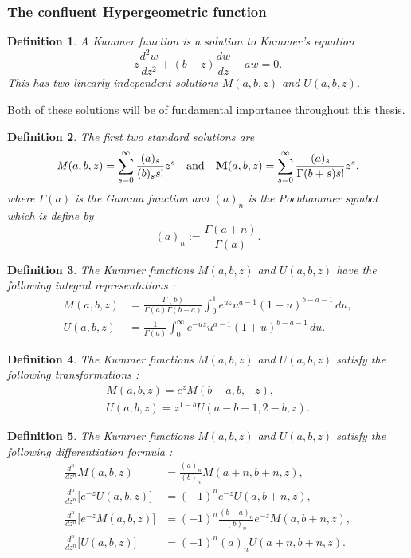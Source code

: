 \documentclass[12pt]{article}
\def\e{e^{-z}}
\newtheorem{mydef1}{Definition}[section]
\numberwithin{figure}{section}
\numberwithin{equation}{section}
\numberwithin{table}{section}
\begin{document}
\subsubsection{The confluent Hypergeometric function}
\begin{mydef1}
A Kummer function is a solution to Kummer's equation \cite[\S13.2(i)]{DLMF}
$$z\frac{d^2w}{dz^2}+(b-z)\frac{dw}{dz}-aw=0.$$
This has two linearly independent solutions $M(a,b,z)$ and $U(a,b,z)$.
\end{mydef1}
Both of these solutions will be of fundamental importance throughout this
thesis.
\begin{mydef1}
The first two standard solutions are \cite[\S13.2(i)]{DLMF}
\begin{equation}
{\it{M}}(a,b,z)=\sum^\infty_{s=0}\frac{(a)_s}{(b)_ss!}z^s\quad {\rm{and}}\quad{\bf{M}}
(a,b,z)=\sum^\infty_{s=0}\frac{(a)_s}{\Gamma(b+s)s!}z^s.\label{sum}
\end{equation}
where $\Gamma(a)$ is the Gamma function and $(a)_n$ is the Pochhammer symbol which is define by
$$(a)_n:=\frac{\Gamma(a+n)}{\Gamma(a)}.$$
\end{mydef1}
\begin{mydef1}
The Kummer functions $M(a,b,z)$ and $U(a,b,z)$  have the following integral representations \cite[\S13.4(i)]{DLMF}:
\begin{subequations}
\begin{align}
M(a,b,z)&=\frac{\Gamma(b)}{\Gamma(a)\Gamma(b-a)}\int^{1}_0e^{uz}u^{a-1}(1-u)^{b-a-1}\,du,\label{a1}\\
U(a,b,z)&=\frac{1}{\Gamma(a)}\int^{\infty}_0e^{-uz}u^{a-1}(1+u)^{b-a-1}\,du.\label{a2}
\end{align}
\end{subequations}
\end{mydef1}
\begin{mydef1}
The Kummer functions $M(a,b,z)$ and $U(a,b,z)$  satisfy the following transformations \cite[\S13.2(vii)]{DLMF}:
\begin{subequations}
\begin{align}
M(a,b,z)=e^zM(b-a,b,-z),\label{transformation1}\\
U(a,b,z)=z^{1-b}U(a-b+1,2-b,z)\label{transformation2}.
\end{align}
\end{subequations}
\end{mydef1}
\begin{mydef1}
The Kummer functions $M(a,b,z)$ and $U(a,b,z)$ satisfy the following differentiation formula \cite[\S13.3(ii)]{DLMF}:
\begin{subequations}
\begin{align}
\frac{d^n}{dz^n}M(a,b,z)&=\frac{(a)_n}{(b)_n}M(a+n,b+n,z),\label{diff1}\\
\frac{d^n}{dz^n}\bigg[\e U(a,b,z)\bigg]&=(-1)^n\e U(a,b+n,z),\label{diff2}\\
\frac{d^n}{dz^n}\bigg[\e M(a,b,z)\bigg]&=(-1)^n\frac{(b-a)_n}{(b)_n}\e M(a,b+n,z),\label{diff3}\\
\frac{d^n}{dz^n}\bigg[U(a,b,z)\bigg]&=(-1)^n (a)_n U(a+n,b+n,z).\label{diff4}
\end{align}
\end{subequations}
\end{mydef1}
\end{document}
